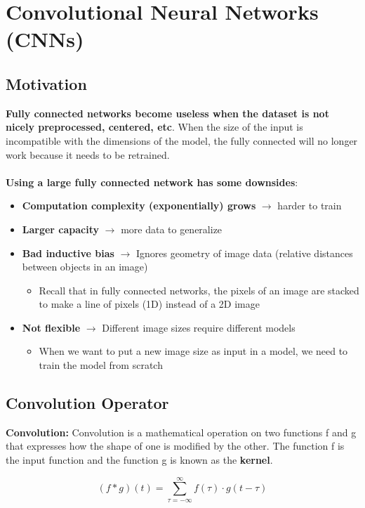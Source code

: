 \chapter{Convolutional Neural Networks (CNNs)}

\space

\section{Motivation}

\textbf{Fully connected networks become useless when the dataset is not nicely preprocessed, centered, etc}. When the size of the input is incompatible with the dimensions of the model, the fully connected will no longer work because it needs to be retrained.\\

\\\textbf{Using a large fully connected network has some downsides}:
\begin{itemize}
    \item \textbf{Computation complexity (exponentially) grows} $\rightarrow$ harder to train
    \item \textbf{Larger capacity} $\rightarrow$ more data to generalize
    \item \textbf{Bad inductive bias} $\rightarrow$ Ignores geometry of image data (relative distances between objects in an image)
    \begin{itemize}
        \item Recall that in fully connected networks, the pixels of an image are stacked to make a line of pixels (1D) instead of a 2D image
    \end{itemize}
    \item \textbf{Not flexible} $\rightarrow$ Different image sizes require different models
    \begin{itemize}
        \item When we want to put a new image size as input in a model, we need to train the model from scratch
    \end{itemize}
\end{itemize}

\section{Convolution Operator}

\begin{definition}
    \textbf{Convolution:} Convolution is a mathematical operation on two functions f and g that expresses how
the shape of one is modified by the other. The function f is the input function and the function g is known as the\textbf{ kernel}.

\[
(f * g)(t) = \sum_{\tau = -\infty}^{\infty} f(\tau) \cdot g(t - \tau)
\]

\end{definition}

